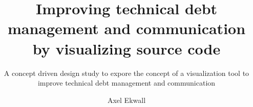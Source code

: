 \documentclass[sigchi, nonacm, balance=false, authorversion=true]{acmart}
\begin{document}
\title{Improving technical debt management and communication by visualizing source code}
\subtitle{A concept driven design study to expore the concept of a visualization tool to improve technical debt management and communication}
\author{Axel Ekwall}




\maketitle














\appendix
\end{document}
